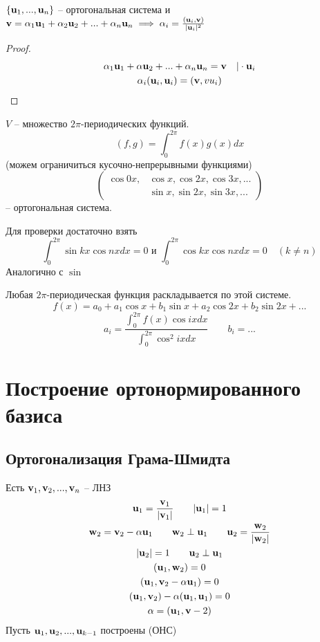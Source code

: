 \documentclass[main]{subfiles}
\begin{document}
\begin{assertion}
    $\{\mathbf{u}_1, ..., \mathbf{u}_n\}$ -- ортогональная система и
    $\mathbf{v} = \alpha_1 \mathbf{u}_1 + \alpha_2 \mathbf{u}_2 + ... + \alpha_n \mathbf{u}_n
        \implies \alpha_i = \frac{(\mathbf{u}_i, \mathbf{v})}{|\mathbf{u}_i|^2}$
\end{assertion}
\begin{proof}
    \begin{gather*}
        \alpha_1 \mathbf{u}_1 + \alpha \mathbf{u}_2 + ... + \alpha_n \mathbf{u}_n = \mathbf{v} \quad |\cdot \mathbf{u}_i\\
        \alpha_i(\mathbf{u}_i, \mathbf{u}_i) = (\mathbf{v}, vu_i)
    \end{gather*}
\end{proof}
\begin{example}
    $V$ -- множество $2\pi$-периодических функций.
    \[(f,g) = \int_0^{2\pi} f(x)g(x)dx\]
    (можем ограничиться кусочно-непрерывными функциями)
    \[\left(
        \begin{aligned}
                \cos0x, & \cos x, \cos 2x, \cos 3x, ... \\
                        & \sin x, \sin 2x, \sin 3x, ...
            \end{aligned}
        \right)\]
    -- ортогональная система.

    Для проверки достаточно взять
    \[\int_0^{2\pi} \sin kx \cos nx dx = 0 \text{ и }
        \int_0^{2\pi} \cos kx \cos nx dx =0 \quad (k\neq n)\]
    Аналогично с $\sin$

    Любая $2\pi$-периодическая функция раскладывается по этой системе.
    \[f(x) = a_0 + a_1 \cos x + b_1 \sin x + a_2 \cos 2x + b_2 \sin 2x + ...\]
    \[a_i = \frac{\int_0^{2\pi} f(x) \cos ix dx}{\int_0^{2\pi} \cos^2 ix dx} \qquad b_i=...\]
\end{example}


\section{Построение ортонормированного базиса}
\subsection{Ортогонализация Грама-Шмидта}
Есть $\mathbf{v}_1, \mathbf{v}_2, ..., \mathbf{v}_n$ -- ЛНЗ
\begin{gather*}
    \mathbf{u}_1 = \frac{\mathbf{v}_1}{|\mathbf{v}_1|} \qquad |\mathbf{u}_1| = 1\\
    \mathbf{w}_2 = \mathbf{v}_2 - \alpha \mathbf{u}_1 \qquad \mathbf{w}_2 \perp \mathbf{u}_1 \qquad \mathbf{u}_2 = \frac{\mathbf{w}_2}{|\mathbf{w}_2|}\\
    |\mathbf{u}_2|=1 \qquad \mathbf{u}_2 \perp \mathbf{u}_1\\
    (\mathbf{u}_1, \mathbf{w}_2) = 0\\
    (\mathbf{u}_1, \mathbf{v}_2 - \alpha \mathbf{u}_ 1) = 0\\
    (\mathbf{u}_1, \mathbf{v}_2) - \alpha (\mathbf{u}_1, \mathbf{u}_1)=0\\
    \alpha = (\mathbf{u}_1, \mathbf{v}-2)
\end{gather*}
Пусть $\mathbf{u}_1, \mathbf{u}_2, ..., \mathbf{u}_{k-1}$ построены (ОНС)
\end{document}
